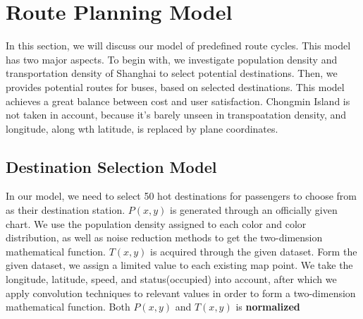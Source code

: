 \documentclass{mcmthesis}
\begin{document}
\section{Route Planning Model}

In this section, we will discuss our model of predefined route cycles. This model has two major aspects. To begin with, we investigate population density and transportation density of Shanghai to select potential destinations. Then, we provides potential routes for buses, based on selected destinations. This model achieves a great balance between cost and user satisfaction. Chongmin Island is not taken in account, because it's barely unseen in transpoatation density, and longitude, along wth latitude, is replaced by plane coordinates.

\subsection{Destination Selection Model}

In our model, we need to select 50 hot destinations for passengers to choose from as their destination station. $P(x,y)$ is generated through an officially given chart. We use the population density assigned to each color and color distribution, as well as noise reduction methods to get the two-dimension mathematical function. $T(x,y)$ is acquired through the given dataset. Form the given dataset, we assign a limited value to each existing map point. We take the longitude, latitude, speed, and status(occupied) into account, after which we apply convolution techniques to relevant values in order to form a two-dimension mathematical function. Both $P(x,y)$ and $T(x,y)$ is \textbf{normalized}
\end{document}
